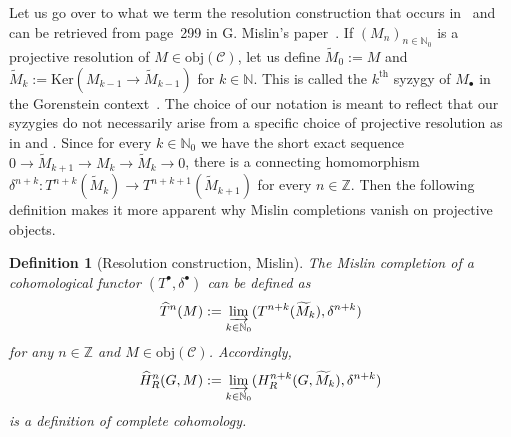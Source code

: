 \documentclass[12pt, a4paper]{article}
\numberwithin{equation}{section}
\newtheorem{defn}[thm]{Definition}
\theoremstyle{empty}
\theoremstyle{nonumberplain}
\begin{document}
Let us go over to what we term the resolution construction that occurs in~\cite[Lemma~B.3]{cel17} and can be retrieved from page~299 in G.\! Mislin's paper~\cite{mis94}. If $(M_n)_{n \in \mathbb{N}_0}$ is a projective resolution of $M \in \mathrm{obj}(\mathcal{C})$, let us define $\widetilde{M}_0 := M$ and $\widetilde{M}_k := \mathrm{Ker}(M_{k-1} \rightarrow \widetilde{M}_{k-1})$ for $k \in \mathbb{N}$. This is called the $k^{\text{th}}$ syzygy of $M_{\bullet}$ in the Gorenstein context~\cite[p.~89]{pag16}. The choice of our notation is meant to reflect that our syzygies do not necessarily arise from a specific choice of projective resolution as in \cite{kro95} and \cite{mis94}. Since for every $k \in \mathbb{N}_0$ we have the short exact sequence $0 \rightarrow \widetilde{M}_{k+1} \rightarrow M_k \rightarrow \widetilde{M}_k \rightarrow 0$, there is a connecting homomorphism $\delta^{n+k}: T^{n+k}(\widetilde{M}_k) \rightarrow T^{n+k+1}(\widetilde{M}_{k+1})$ for every $n \in \mathbb{Z}$. Then the following definition makes it more apparent why Mislin completions vanish on projective objects.

\begin{defn}[Resolution construction, Mislin]\label{defn:resolsinoutline}
The Mislin completion of a cohomological functor $(T^{\bullet}, \delta^{\bullet})$ can be defined as 
\[ \widehat{T}^n(M) := \varinjlim_{k \in \mathbb{N}_0} (T^{n+k}(\widetilde{M}_k), \delta^{n+k}) \]
for any $n \in \mathbb{Z}$ and $M \in \mathrm{obj}(\mathcal{C})$. Accordingly,
\[ \widehat{H}_R^n(G, M) := \varinjlim_{k \in \mathbb{N}_0} (H_R^{n+k}(G, \widetilde{M}_k), \delta^{n+k}) \]
is a definition of complete cohomology.
\end{defn}
\end{document}
